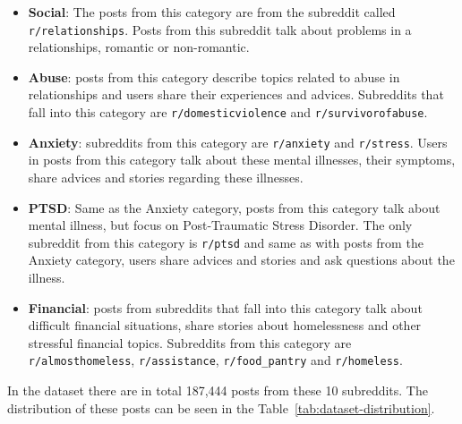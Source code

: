 \documentclass[10pt, a4paper]{article}
\begin{document}
\begin{itemize}
    \item \textbf{Social}: The posts from this category are from the subreddit called \verb|r/relationships|.
        Posts from this subreddit talk about problems in a relationships, romantic or non-romantic.
    \item \textbf{Abuse}: posts from this category describe topics related to abuse in relationships and users share their experiences and advices.
        Subreddits that fall into this category are \verb|r/domesticviolence| and \verb|r/survivorofabuse|.
    \item \textbf{Anxiety}: subreddits from this category are \verb|r/anxiety| and \verb|r/stress|.
        Users in posts from this category talk about these mental illnesses, their symptoms, share advices and stories regarding these illnesses.
    \item \textbf{PTSD}: Same as the Anxiety category, posts from this category talk about mental illness, but focus on Post-Traumatic Stress Disorder.
        The only subreddit from this category is \verb|r/ptsd| and same as with posts from the Anxiety category, users share advices and stories and ask questions about the illness.
    \item \textbf{Financial}: posts from subreddits that fall into this category talk about difficult financial situations, share stories about homelessness and other stressful financial topics.
        Subreddits from this category are \verb|r/almosthomeless|, \verb|r/assistance|, \verb|r/food_pantry| and \verb|r/homeless|.
\end{itemize}

In the dataset there are in total 187,444 posts from these 10 subreddits.
The distribution of these posts can be seen in the Table~\ref{tab:dataset-distribution}.
\end{document}
